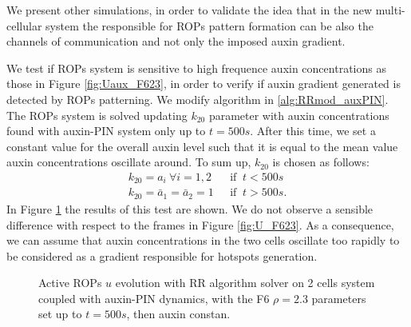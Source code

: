 We present other simulations, in order to validate the idea that in the new multi-cellular system the responsible for ROPs pattern formation can be also the channels of communication and not only the imposed auxin gradient.

We test if ROPs system is sensitive to high frequence auxin concentrations as those in Figure \ref{fig:Uaux_F623}, in order to verify if auxin gradient generated is detected by ROPs patterning. We modify algorithm in \ref{alg:RRmod_auxPIN}. The ROPs system is solved updating $k_{20}$ parameter with auxin concentrations found with auxin-PIN system only up to $t = 500s$. After this time, we set a constant value for the overall auxin level such that it is equal to the mean value auxin concentrations oscillate around. To sum up, $k_{20}$ is chosen as follows:
\begin{equation*}\begin{aligned}
  k_{20} = a_i \ \forall i = 1,2 \ \ \ &\text{if } \ t < 500 s \\[6pt]
  k_{20} = \bar{a}_1 = \bar{a}_2 = 1 \ \ \ &\text{if } \ t > 500 s.
\end{aligned}\end{equation*}
In Figure \ref{fig:U_F623_auxinconst} the results of this test are shown. We do not observe a sensible difference with respect to the frames in Figure \ref{fig:U_F623}. As a consequence, we can assume that auxin concentrations in the two cells oscillate too rapidly to be considered as a gradient responsible for hotspots generation.
\begin{figure}[H]
    \centering
    \quad
    \quad
    \quad
    \quad
    \quad
    \quad
    \quad
    \quad
    \caption[2cell RR Active ROPs coupled auxin-PIN - with the F6 $\rho = 2.3$ set up to $t = 500s$]{Active ROPs $u$ evolution with RR algorithm solver on 2 cells system coupled with auxin-PIN dynamics, with the F6 $\rho = 2.3$ parameters set up to $t = 500s$, then auxin constan.}
    \label{fig:U_F623_auxinconst}
\end{figure}

